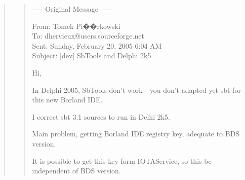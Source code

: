 \begin{itemize}
\begin{quotation}
\begin{quote}
      ----- Original Message -----

      From: Tomek Pi��rkowski \\
      To: dhervieux@users.sourceforge.net \\
      Sent: Sunday, February 20, 2005 6:04 AM \\
      Subject: [dev] SbTools and Delphi 2k5


      Hi,



      In Delphi 2005, SbTools don't work - you don't adapted yet sbt for
      this new Borland IDE.

      I correct sbt 3.1 sources to run in Delhi 2k5.



      Main problem, getting Borland IDE registry key, adequate to BDS
      version.

      It is possible to get this key form IOTAService, so this be
      independent of BDS version.


\end{quote}
\end{quotation}
\end{itemize}
